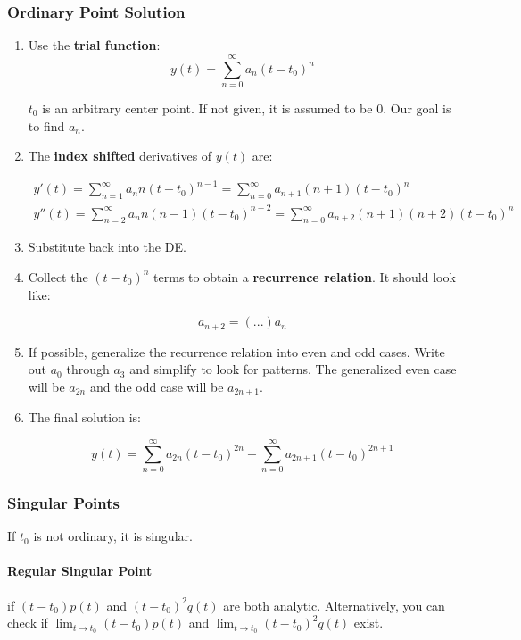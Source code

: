 \documentclass[11pt]{article}
\begin{document}
\subsubsection*{Ordinary Point Solution}
\begin{enumerate}

\item Use the \textbf{trial function}:
$$
y(t)= \sum \limits_{n=0}^{\infty} a_n(t-t_0)^n
$$

$t_0$ is an arbitrary center point. If not given, it is assumed to be 0. Our goal is to find $a_n$.

\item The \textbf{index shifted} derivatives of $y(t)$ are:

\begin{gather*}
y'(t)= \sum \limits_{n=1}^{\infty} a_n n (t-t_0)^{n-1} = \sum \limits_{n=0}^{\infty} a_{n+1} (n+1) (t-t_0)^n \\
y''(t)= \sum \limits_{n=2}^{\infty} a_n n (n-1)(t-t_0)^{n-2} = \sum \limits_{n=0}^{\infty} a_{n+2} (n+1) (n+2) (t-t_0)^n
\end{gather*}

\item Substitute back into the DE.
\item Collect the $(t-t_0)^n$ terms to obtain a \textbf{recurrence relation}. It should look like:

$$
a_{n+2} = (...)a_n
$$

\item If possible, generalize the recurrence relation into even and odd cases. Write out $a_0$ through $a_3$ and simplify to look for patterns. The generalized even case will be $a_{2n}$ and the odd case will be $a_{2n+1}$.

\item The final solution is:

$$
y(t) = \sum \limits_{n=0}^{\infty} a_{2n} (t-t_0)^{2n} + \sum \limits_{n=0}^{\infty} a_{2n+1} (t-t_0)^{2n+1}
$$

\end{enumerate}

\subsubsection*{Singular Points}
If $t_0$ is not ordinary, it is singular.
 \paragraph{Regular Singular Point} if $(t-t_0)p(t)$ and $(t-t_0)^2 q(t)$ are both analytic. Alternatively, you can check if $\displaystyle{ \lim_{t\to t_0} (t-t_0)p(t) }$ and $\displaystyle{ \lim_{t\to t_0} (t-t_0)^2 q(t) }$ exist.
\end{document}
